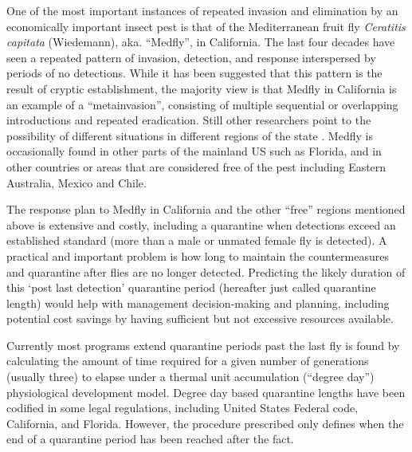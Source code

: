 \documentclass[10pt,a4paper,twocolumn]{article}
\begin{document}
One of the most important instances of repeated invasion 
and elimination by an economically important insect pest is that of 
the Mediterranean fruit fly \textit{Ceratitis capitata} (Wiedemann), aka. ``Medfly'', 
in California.  
The last four decades have seen a repeated pattern of
invasion, detection, and response 
interspersed by periods of no detections\cite{carey_establishment_1991, papadopoulos_trickle_2013}.
While it has been suggested that this pattern is the result of
cryptic establishment\cite{carey201730}, 
the majority view is
that Medfly in California is an example of 
a ``metainvasion'', consisting of multiple sequential or
overlapping introductions\cite{davies_bioinvasions_1999}
and repeated eradication\cite{haymer_genetic_1997}.
Still other researchers point to the possibility of different situations
in different regions of the state
\cite{bonizzoni_microsatellite_2001,gasperi_genetic_2002}.
Medfly is occasionally found in 
other parts of the mainland US such as Florida\cite{szyniszewska2016analysis},
and in other countries or areas that are considered 
free of the pest including Eastern Australia, Mexico and Chile\cite{mcinnis2017can}.

The response plan to Medfly in California and the other ``free'' 
regions mentioned above is extensive and costly, 
including a quarantine when detections exceed an established standard
(more than a male or unmated female fly is detected)\cite{gilbert_insect_2013}.
A practical and important problem is how long to maintain 
the countermeasures and quarantine after flies are no longer detected.
Predicting the likely duration of this `post last detection' quarantine period
(hereafter just called quarantine length) would help with
management decision-making and planning,
including potential cost savings by having sufficient but not excessive
resources available.

Currently most programs extend quarantine periods past the last fly is found
by calculating the amount of time required for a given number 
of generations (usually three) to elapse under a thermal unit accumulation (``degree day'')
physiological development model.
Degree day based quarantine lengths have been codified in some legal
regulations, including 
United States Federal code\cite{US-301.32-10},
California\cite{3-CA-ADC-3406}, and Florida.
However, the procedure prescribed only defines when the end of a
quarantine period has been reached after the fact.
\end{document}
